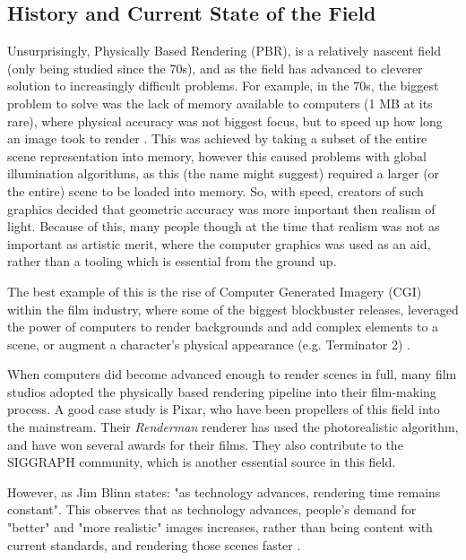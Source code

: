 \documentclass[../main.tex]{subfiles}
\begin{document}
\subsection{History and Current State of the Field}
Unsurprisingly, Physically Based Rendering (PBR), is a relatively nascent field (only being studied since the 70s), and as the field has advanced to cleverer solution to increasingly difficult problems. 
For example, in the 70s, the biggest problem to solve was the lack of memory available to computers (1 MB at its rare), where physical accuracy was not biggest focus, but to speed up how long an image took to render \cite{pharr_physically_2016}. This was achieved by taking a subset of the entire scene representation into memory, however this caused problems with global illumination algorithms, as this (the name might suggest) required a larger (or the entire) scene to be loaded into memory. So, with speed, creators of such graphics decided that geometric accuracy was more important then realism of light. Because of this, many people though at the time that realism was not as important as artistic merit, where the computer graphics was used as an aid, rather than a tooling which is essential from the ground up. 

The best example of this is the rise of Computer Generated Imagery (CGI) within the film industry, where some of the biggest blockbuster releases, leveraged the power of computers to render backgrounds and add complex elements to a scene, or augment a character's physical appearance (e.g. Terminator 2) \cite{bramesco_terminator_2021}.

When computers did become advanced enough to render scenes in full, many film studios adopted the physically based rendering pipeline into their film-making process. A good case study is Pixar, who have been propellers of this field into the mainstream. Their \textit{Renderman} renderer has used the photorealistic algorithm, and have won several awards for their films. They also contribute to the SIGGRAPH community, which is another essential source in this field.

However, as Jim Blinn states: "as technology advances, rendering time remains constant". This observes that as technology advances, people's demand for "better" and "more realistic" images increases, rather than being content with current standards, and rendering those scenes faster \cite{pharr_physically_2016}.
\end{document}
